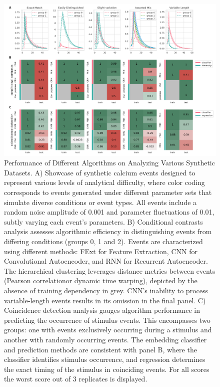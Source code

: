 \begin{figure}[!htb]
\begin{center}
\includegraphics[width=\linewidth]{figures/6.png}
\end{center}
\caption{
Performance of Different Algorithms on Analyzing Various Synthetic Datasets. A) Showcase of synthetic calcium events designed to represent various levels of analytical difficulty, where color coding corresponds to events generated under different parameter sets that simulate diverse conditions or event types. All events include a random noise amplitude of 0.001 and parameter fluctuations of 0.01, subtly varying each event's parameters. B) Conditional contrasts analysis assesses algorithmic efficiency in distinguishing events from differing conditions (groups 0, 1 and 2). Events are characterized using different methods: FExt for Feature Extraction, CNN for Convolutional Autoencoder, and RNN for Recurrent Autoencoder. The hierarchical clustering leverages distance metrics between events (Pearson correlationor dynamic time warping), depicted by the absence of training dependency in grey. CNN's inability to process variable-length events results in its omission in the final panel. C) Coincidence detection analysis gauges algorithm performance in predicting the occurrence of stimulus events. This encompasses two groups: one with events exclusively occurring during a stimulus and another with randomly occurring events. The embedding classifier and prediction methods are consistent with panel B, where the classifier identifies stimulus occurrence, and regression determines the exact timing of the stimulus in coinciding events. For all scores the worst score out of 3 replicates is displayed.
}\label{fig:6}
\end{figure}

